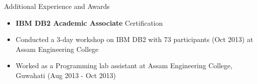 \documentclass[]{resume}
\begin{document}
	\begin{cvsection}{Additional Experience and Awards}
		\begin{cvsubsection}{}{}{}	
			\begin{itemize}
				\item \textbf{IBM DB2 Academic Associate} Certification
				\item Conducted a 3-day workshop on IBM DB2 with 73 participants (Oct 2013) at Assam Engineering College
				\item Worked as a Programming lab assistant at Assam Engineering College, Guwahati (Aug 2013 - Oct 2013)
			\end{itemize}
		\end{cvsubsection}
	\end{cvsection}
	
	
\end{document}
